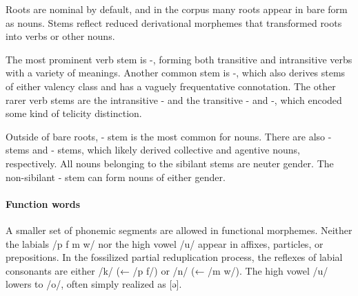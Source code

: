 Roots are nominal by default, and in the corpus many roots appear in bare form as nouns. Stems reflect reduced derivational morphemes that transformed roots into verbs or other nouns.

The most prominent verb stem is -, forming both transitive and intransitive verbs with a variety of meanings. Another common stem is -, which also derives stems of either valency class and has a vaguely frequentative connotation. The other rarer verb stems are the intransitive - and the transitive - and -, which encoded some kind of telicity distinction.

Outside of bare roots, - stem is the most common for nouns. There are also - stems and - stems, which likely derived collective and agentive nouns, respectively. All nouns belonging to the sibilant stems are neuter gender. The non-sibilant - stem can form nouns of either gender.

\paragraph{Function words}
A smaller set of phonemic segments are allowed in functional morphemes. Neither the labials /p f m w/ nor the high vowel /u/ appear in affixes, particles, or prepositions. In the fossilized partial reduplication process, the reflexes of labial consonants are either /k/ (← /p f/) or /n/ (← /m w/). The high vowel /u/ lowers to /o/, often simply realized as [ə].